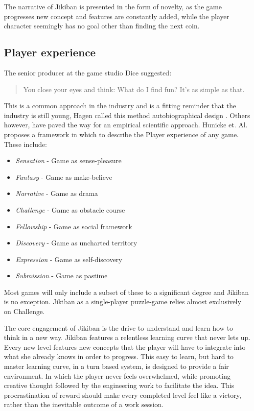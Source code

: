 The narrative of Jikiban is presented in the form of novelty, as the
game progresses new concept and features are constantly added, while
the player character seemingly has no goal other than finding the next
coin.

\subsection{Player experience}
The senior producer at the game studio Dice suggested\cite{hagen10}:

\begin{quotation}
You close your eyes and think: What do I find fun? It’s as simple as that.
\end{quotation}

This is a common approach in the industry and is a fitting reminder
that the industry is still young, Hagen called this method
autobiographical design \cite{hagen10}. Others however, have paved the
way for an empirical scientific approach. Hunicke et. Al.  proposes a
framework in which to describe the Player experience of any
game\cite{hunicke01-04}. These include:

\begin{itemize}
\item \emph{Sensation} - Game as sense-pleasure
\item \emph{Fantasy} - Game as make-believe
\item \emph{Narrative} - Game as drama
\item \emph{Challenge} - Game as obstacle course

\item \emph{Fellowship} %
 - Game as social framework %
\item \emph{Discovery} - Game as uncharted territory
\item \emph{Expression} - Game as self-discovery
\item \emph{Submission} - Game as pastime
\end{itemize}

Most games will only include a subset of these to a significant degree
and Jikiban is no exception. Jikiban as a single-player puzzle-game
relies almost exclusively on Challenge.

The core engagement of Jikiban is the drive to understand and learn
how to think in a new way. Jikiban features a relentless learning
curve that never lets up. Every new level features new concepts that
the player will have to integrate into what she already knows in order
to progress. This easy to learn, but hard to master learning curve, in
a turn based system, is designed to provide a fair environment. In which
the player never feels overwhelmed, while promoting creative thought
followed by the engineering work to facilitate the idea. This
procrastination of reward should make every completed level feel like
a victory, rather than the inevitable outcome of a work session.

